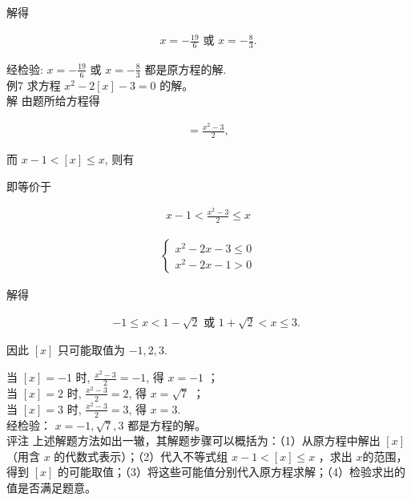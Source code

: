 \documentclass[10pt]{article}
\begin{document}
解得

\begin{align*}
x=-\frac{19}{6} \text { 或 } x=-\frac{8}{3} .
\end{align*}

经检验: $x=-\frac{19}{6}$ 或 $x=-\frac{8}{3}$ 都是原方程的解.\\
例7 求方程 $x^{2}-2[x]-3=0$ 的解。\\
解 由题所给方程得

\begin{align*}
[x]=\frac{x^{2}-3}{2},
\end{align*}

而 $x-1<[x] \leqslant x$, 则有

即等价于

\begin{align*}
x-1<\frac{x^{2}-3}{2} \leqslant x
\end{align*}

\begin{align*}
\left\{\begin{array}{l}
x^{2}-2 x-3 \leqslant 0 \\
x^{2}-2 x-1>0
\end{array}\right.
\end{align*}

解得

\begin{align*}
-1 \leqslant x<1-\sqrt{2} \text { 或 } 1+\sqrt{2}<x \leqslant 3 \text {. }
\end{align*}

因此 $[x]$ 只可能取值为 $-1,2,3$.

当 $[x]=-1$ 时, $\frac{x^{2}-3}{2}=-1$, 得 $x=-1$ ；\\
当 $[x]=2$ 时, $\frac{x^{2}-3}{2}=2$, 得 $x=\sqrt{7}$ ；\\
当 $[x]=3$ 时, $\frac{x^{2}-3}{2}=3$, 得 $x=3$.\\
经检验： $x=-1, \sqrt{7}, 3$ 都是方程的解。\\
评注 上述解题方法如出一辙，其解题步骤可以概括为：（1）从原方程中解出 $[x]$ （用含 $x$ 的代数式表示）；（2）代入不等式组 $x-1<[x] \leqslant x$ ，求出 $x$的范围，得到 $[x]$ 的可能取值；（3）将这些可能值分别代入原方程求解；（4）检验求出的值是否满足题意。
\end{document}
